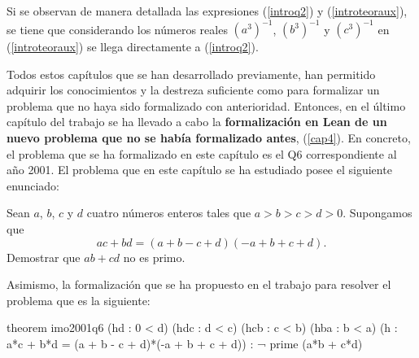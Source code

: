 Si se observan de manera detallada las expresiones (\ref{introq2}) y
(\ref{introteoraux}), se tiene que considerando los números reales
\((a^{3})^{-1}\), \((b^{3})^{-1}\) y \((c^{3})^{-1}\) en (\ref{introteoraux}) se
llega directamente a (\ref{introq2}).


Todos estos capítulos que se han desarrollado previamente, han permitido
adquirir los conocimientos y la destreza suficiente como para formalizar un
problema que no haya sido formalizado con anterioridad. Entonces, en el último
capítulo del trabajo se ha llevado a cabo la \textbf{
formalización en Lean de un nuevo problema que no se había formalizado antes},
(\ref{cap4}). En concreto, el problema que se ha formalizado en este capítulo es
el Q6 correspondiente al año 2001. El problema que en este capítulo se ha
estudiado posee el siguiente enunciado:

\noindent
Sean \(a\), \(b\), \(c\) y \(d\) cuatro números enteros tales que
\(a > b > c > d > 0\). Supongamos que
\begin{equation}\label{introhipotesis}\tag{h}
  ac+bd = (a+b-c+d)(-a+b+c+d).
\end{equation}
Demostrar que \(ab+cd\) no es primo.

Asimismo, la formalización que se ha propuesto en el trabajo para resolver el
problema que es la siguiente:

\begin{leancode}
theorem imo2001q6
  (hd  : 0 < d)
  (hdc : d < c)
  (hcb : c < b)
  (hba : b < a)
  (h : a*c + b*d = (a + b - c + d)*(-a + b + c + d))
  : ¬ prime (a*b + c*d)
\end{leancode}

